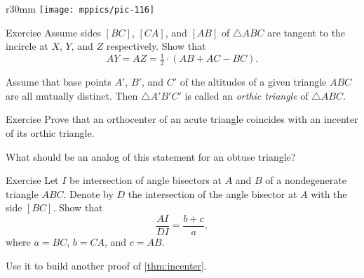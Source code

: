 {

\begin{wrapfigure}{r}{30mm}
\centering
\vskip-2mm
\texttt{[image: mppics/pic-116]}
\end{wrapfigure}

\begin{thm}{Exercise}\label{ex:2x=b+c-a}
Assume sides $[B C]$, $[C A]$, and $[A B]$ of $\triangle A B C$ are tangent to the incircle at $X$, $Y$, and $Z$ respectively. 
Show that 
$$AY=AZ= \tfrac12\cdot(A B+ A C- B C).$$

\end{thm}

Assume that base points $A'$, $B'$, and $C'$ of the altitudes of a given triangle $ABC$ are all mutually distinct.
Then $\triangle A'B'C'$ is called an \emph{orthic triangle} of $\triangle ABC$.

}

\begin{thm}{Exercise}\label{ex:orthic-triangle}
Prove that an orthocenter of an acute triangle coincides with an incenter of its orthic triangle.

What should be an analog of this statement for an obtuse triangle?
\end{thm}

\begin{thm}{Exercise}\label{ex:bisector-incenter}
Let $I$ be intersection of angle bisectors at $A$ and $B$ of a nondegenerate triangle $ABC$.
Denote by $D$ the intersection of the angle bisector at $A$ with the side $[BC]$.
Show that 
\[\frac{AI}{DI}=\frac{b+c}{a},\]
where $a=BC$, $b=CA$, and $c=AB$.

Use it to build another proof of \ref{thm:incenter}.
\end{thm}



